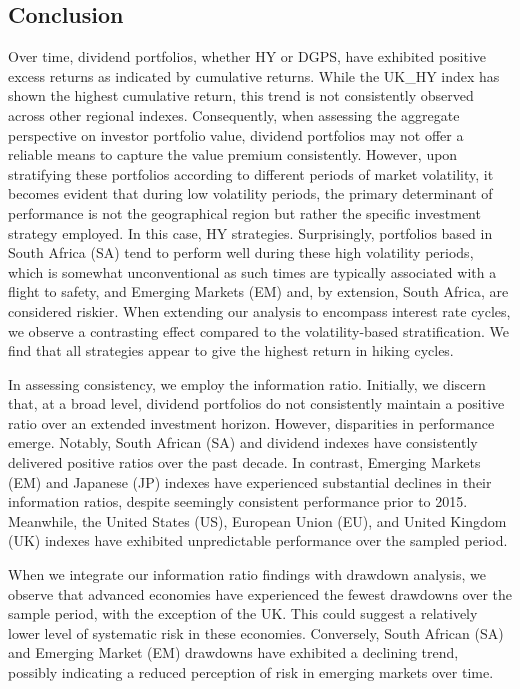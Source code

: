 \documentclass[12pt,preprint, authoryear]{elsarticle}
\numberwithin{equation}{section}
\numberwithin{figure}{section}
\numberwithin{table}{section}
\begin{document}
\hypertarget{conclusion}{%
\subsection{Conclusion}\label{conclusion}}

Over time, dividend portfolios, whether HY or DGPS, have exhibited
positive excess returns as indicated by cumulative returns. While the
UK\_HY index has shown the highest cumulative return, this trend is not
consistently observed across other regional indexes. Consequently, when
assessing the aggregate perspective on investor portfolio value,
dividend portfolios may not offer a reliable means to capture the value
premium consistently. However, upon stratifying these portfolios
according to different periods of market volatility, it becomes evident
that during low volatility periods, the primary determinant of
performance is not the geographical region but rather the specific
investment strategy employed. In this case, HY strategies. Surprisingly,
portfolios based in South Africa (SA) tend to perform well during these
high volatility periods, which is somewhat unconventional as such times
are typically associated with a flight to safety, and Emerging Markets
(EM) and, by extension, South Africa, are considered riskier. When
extending our analysis to encompass interest rate cycles, we observe a
contrasting effect compared to the volatility-based stratification. We
find that all strategies appear to give the highest return in hiking
cycles.

In assessing consistency, we employ the information ratio. Initially, we
discern that, at a broad level, dividend portfolios do not consistently
maintain a positive ratio over an extended investment horizon. However,
disparities in performance emerge. Notably, South African (SA) and
dividend indexes have consistently delivered positive ratios over the
past decade. In contrast, Emerging Markets (EM) and Japanese (JP)
indexes have experienced substantial declines in their information
ratios, despite seemingly consistent performance prior to 2015.
Meanwhile, the United States (US), European Union (EU), and United
Kingdom (UK) indexes have exhibited unpredictable performance over the
sampled period.

When we integrate our information ratio findings with drawdown analysis,
we observe that advanced economies have experienced the fewest drawdowns
over the sample period, with the exception of the UK. This could suggest
a relatively lower level of systematic risk in these economies.
Conversely, South African (SA) and Emerging Market (EM) drawdowns have
exhibited a declining trend, possibly indicating a reduced perception of
risk in emerging markets over time.
\end{document}
